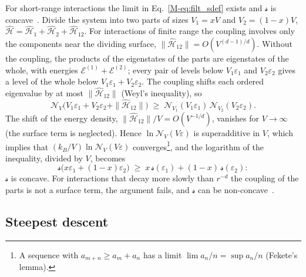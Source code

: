 \documentclass[10pt,a4paper]{article}
\theoremstyle{plain}
\theoremstyle{remark}
\newcommand{\cN}{\mathcal{N}}   %
\newcommand{\enrg}{\mathcal{E}}  %
\newcommand{\lds}{\mathscr{s}}  %
\begin{document}
For short-range interactions the limit in Eq.~\eqref{M-eq:filt_sdef} exists
and $\lds$ is concave~\cite{Ruelle}. Divide the system into two parts of sizes $ V_1 = xV $ and
$ V_2 = (1-x)V $, $\hat{\mathcal H}=\hat{\mathcal H}_1+\hat{\mathcal H}_2+\hat{\mathcal H}_{12}$.
For interactions of finite range the coupling involves only the components
near the dividing surface, $\|\hat{\mathcal H}_{12}\|=O(V^{(d-1)/d})$.
Without the coupling, the products of the eigenstates of the parts are
eigenstates of the whole, with energies $ \enrg^{(1)} + \enrg^{(2)} $; every pair
of levels below $ V_1\varepsilon_1 $ and $ V_2\varepsilon_2 $ gives a level of the whole below
$ V_1\varepsilon_1 + V_2\varepsilon_2 $. The coupling shifts each ordered eigenvalue by at most
$\|\hat{\mathcal H}_{12}\|$ (Weyl's inequality), so
\[
  \cN_V\big(V_1\varepsilon_1 + V_2\varepsilon_2+\|\hat{\mathcal H}_{12}\|\big)\;\geq\;
  \cN_{V_1}(V_1\varepsilon_1)\,\cN_{V_2}(V_2\varepsilon_2) .
\]
The shift of the energy density, $\|\hat{\mathcal H}_{12}\|/V=O(V^{-1/d})$,
vanishes for $V\to\infty$ (the surface term is neglected). Hence
$ \ln\cN_V(V\varepsilon) $ is superadditive in $ V $, which implies that
$ (k_B/V)\ln\cN_V(V\varepsilon) $ converges\footnote{A sequence with
$ a_{m+n} \geq a_m + a_n $ has a limit $ \lim a_n/n = \sup a_n/n $ (Fekete's
lemma).}, and the logarithm of the inequality, divided by $ V $, becomes
\begin{equation}\label{eq:filt_concave}
  \lds\big(x\varepsilon_1 + (1-x)\varepsilon_2\big)\;\geq\;x\,\lds(\varepsilon_1) + (1-x)\,\lds(\varepsilon_2) :
\end{equation}
$ \lds $ is concave. For interactions that decay more slowly than $r^{-d}$ the
coupling of the parts is not a surface term, the argument fails, and $\lds$ can
be non-concave~\cite{Campa2009}.

\subsection{Steepest descent}
\label{sec:second_sd}
\end{document}
